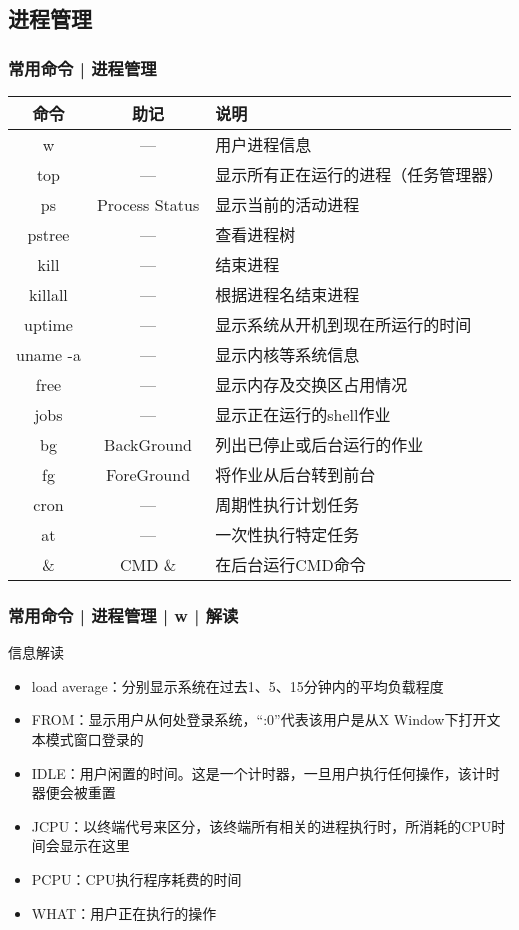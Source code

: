 \subsection{进程管理}
\begin{frame}
  \frametitle{常用命令 | \alert{进程管理}}
  \begin{table}
    \centering
    \begin{tabularx}{\textwidth}{ccX}
      \hline
      \rowcolor{blue!50}命令 & 助记 & 说明\\
      \hline
      w & --- & 用户进程信息\\
      top & --- & 显示所有正在运行的进程（任务管理器）\\
      ps & Process Status & 显示当前的活动进程\\
      pstree & --- & 查看进程树\\
      kill & --- & 结束进程\\
      killall & --- & 根据进程名结束进程\\
      uptime & --- & 显示系统从开机到现在所运行的时间\\
      uname -a & --- & 显示内核等系统信息\\
      free & --- & 显示内存及交换区占用情况\\
      jobs & --- & 显示正在运行的shell作业\\
      bg & BackGround & 列出已停止或后台运行的作业\\
      fg & ForeGround & 将作业从后台转到前台\\
      cron & --- & 周期性执行计划任务\\
      at & --- & 一次性执行特定任务\\
      \& & CMD \& & 在后台运行CMD命令\\
      \hline
    \end{tabularx}
  \end{table}
\end{frame}

\begin{frame}
  \frametitle{常用命令 | 进程管理 | w | 解读}
  \begin{block}{信息解读}
    \begin{itemize}
      \item load average：分别显示系统在过去1、5、15分钟内的平均负载程度
      \item FROM：显示用户从何处登录系统，“:0”代表该用户是从X Window下打开文本模式窗口登录的
      \item IDLE：用户闲置的时间。这是一个计时器，一旦用户执行任何操作，该计时器便会被重置
      \item JCPU：以终端代号来区分，该终端所有相关的进程执行时，所消耗的CPU时间会显示在这里
      \item PCPU：CPU执行程序耗费的时间
      \item WHAT：用户正在执行的操作
    \end{itemize}
  \end{block}
\end{frame}

